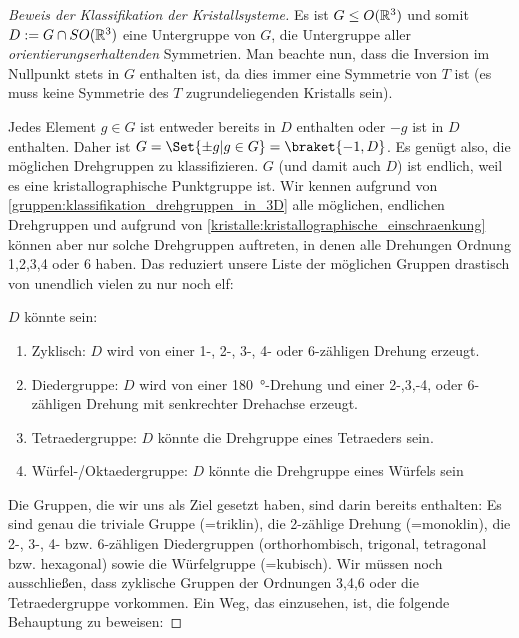 \begin{proof}[Beweis der Klassifikation der Kristallsysteme]
Es ist $G\leq O(\mathbb{R}^3)$ und somit $D:=G\cap SO(\mathbb{R}^3)$ eine Untergruppe von $G$, die Untergruppe aller \emph{orientierungserhaltenden} Symmetrien. Man beachte nun, dass die Inversion im Nullpunkt stets in $G$ enthalten ist, da dies immer eine Symmetrie von $T$ ist (es muss keine Symmetrie des $T$ zugrundeliegenden Kristalls sein).

Jedes Element $g\in G$ ist entweder bereits in $D$ enthalten oder $-g$ ist in $D$ enthalten. Daher ist $G=\Set{\pm g | g\in G} = \braket{-1,D}$. Es genügt also, die möglichen Drehgruppen zu klassifizieren. $G$ (und damit auch $D$) ist endlich, weil es eine kristallographische Punktgruppe ist. Wir kennen aufgrund von \ref{gruppen:klassifikation_drehgruppen_in_3D} alle möglichen, endlichen Drehgruppen und aufgrund von \ref{kristalle:kristallographische_einschraenkung} können aber nur solche Drehgruppen auftreten, in denen alle Drehungen Ordnung 1,2,3,4 oder 6 haben. Das reduziert unsere Liste der möglichen Gruppen drastisch von unendlich vielen zu nur noch elf:

$D$ könnte sein:
\begin{enumerate}
\item Zyklisch: $D$ wird von einer 1-, 2-, 3-, 4- oder 6-zähligen Drehung erzeugt.
\item Diedergruppe: $D$ wird von einer \SI{180}{\degree}-Drehung und einer 2-,3,-4, oder 6-zähligen Drehung mit senkrechter Drehachse erzeugt.
\item Tetraedergruppe: $D$ könnte die Drehgruppe eines Tetraeders sein.
\item Würfel-/Oktaedergruppe: $D$ könnte die Drehgruppe eines Würfels sein
\end{enumerate}

Die Gruppen, die wir uns als Ziel gesetzt haben, sind darin bereits enthalten: Es sind genau die triviale Gruppe (=triklin), die 2-zählige Drehung (=monoklin), die 2-, 3-, 4- bzw. 6-zähligen Diedergruppen (orthorhombisch, trigonal, tetragonal bzw. hexagonal) sowie die Würfelgruppe (=kubisch). Wir müssen noch ausschließen, dass zyklische Gruppen der Ordnungen 3,4,6 oder die Tetraedergruppe vorkommen. Ein Weg, das einzusehen, ist, die folgende Behauptung zu beweisen:

\medbreak
{}


\end{proof}
